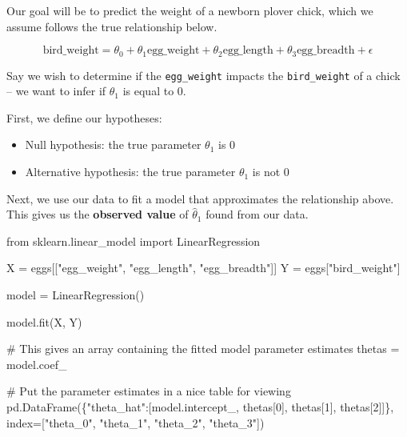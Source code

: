\documentclass[
  letterpaper,
  DIV=11,
  numbers=noendperiod]{scrreprt}
\newenvironment{Shaded}{\begin{snugshade}}{\end{snugshade}}
\newcommand{\CommentTok}[1]{\textcolor[rgb]{0.37,0.37,0.37}{#1}}
\newcommand{\DecValTok}[1]{\textcolor[rgb]{0.68,0.00,0.00}{#1}}
\newcommand{\ImportTok}[1]{\textcolor[rgb]{0.00,0.46,0.62}{#1}}
\newcommand{\NormalTok}[1]{\textcolor[rgb]{0.00,0.23,0.31}{#1}}
\newcommand{\OperatorTok}[1]{\textcolor[rgb]{0.37,0.37,0.37}{#1}}
\newcommand{\StringTok}[1]{\textcolor[rgb]{0.13,0.47,0.30}{#1}}
\providecommand{\tightlist}{%
  \setlength{\itemsep}{0pt}\setlength{\parskip}{0pt}}\usepackage{longtable,booktabs,array}
\begin{document}
Our goal will be to predict the weight of a newborn plover chick, which
we assume follows the true relationship below.

\[\text{bird_weight} = \theta_0 + \theta_1 \text{egg_weight} + \theta_2 \text{egg_length} + \theta_3 \text{egg_breadth} + \epsilon\]

Say we wish to determine if the \texttt{egg\_weight} impacts the
\texttt{bird\_weight} of a chick -- we want to infer if \(\theta_1\) is
equal to 0.

First, we define our hypotheses:

\begin{itemize}
\tightlist
\item
  Null hypothesis: the true parameter \(\theta_1\) is 0
\item
  Alternative hypothesis: the true parameter \(\theta_1\) is not 0
\end{itemize}

Next, we use our data to fit a model that approximates the relationship
above. This gives us the \textbf{observed value} of \(\hat{\theta}_1\)
found from our data.

\begin{Shaded}
\begin{Highlighting}[]
\ImportTok{from}\NormalTok{ sklearn.linear\_model }\ImportTok{import}\NormalTok{ LinearRegression}

\NormalTok{X }\OperatorTok{=}\NormalTok{ eggs[[}\StringTok{"egg\_weight"}\NormalTok{, }\StringTok{"egg\_length"}\NormalTok{, }\StringTok{"egg\_breadth"}\NormalTok{]]}
\NormalTok{Y }\OperatorTok{=}\NormalTok{ eggs[}\StringTok{"bird\_weight"}\NormalTok{]}

\NormalTok{model }\OperatorTok{=}\NormalTok{ LinearRegression()}

\NormalTok{model.fit(X, Y)}

\CommentTok{\# This gives an array containing the fitted model parameter estimates}
\NormalTok{thetas }\OperatorTok{=}\NormalTok{ model.coef\_}

\CommentTok{\# Put the parameter estimates in a nice table for viewing}
\NormalTok{pd.DataFrame(\{}\StringTok{"theta\_hat"}\NormalTok{:[model.intercept\_, thetas[}\DecValTok{0}\NormalTok{], thetas[}\DecValTok{1}\NormalTok{], thetas[}\DecValTok{2}\NormalTok{]]\}, index}\OperatorTok{=}\NormalTok{[}\StringTok{"theta\_0"}\NormalTok{, }\StringTok{"theta\_1"}\NormalTok{, }\StringTok{"theta\_2"}\NormalTok{, }\StringTok{"theta\_3"}\NormalTok{])}
\end{Highlighting}
\end{Shaded}
\end{document}
